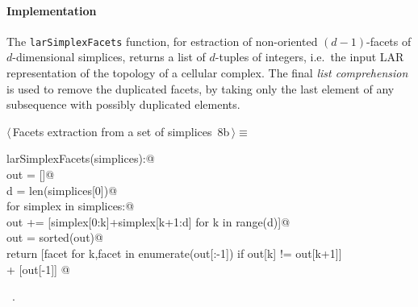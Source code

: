 \documentclass[11pt,oneside]{article}	%
\begin{document}
\paragraph{Implementation}

The \texttt{larSimplexFacets} function, for estraction of non-oriented $(d-1)$-facets of $d$-dimensional simplices, returns a list of $d$-tuples of integers, i.e.~the input LAR representation of the topology of a cellular complex. The final \emph{list comprehension} is used to remove the duplicated facets, by taking only the last element of any subsequence with possibly duplicated elements.
        
\begin{flushleft} \small
\begin{minipage}{\linewidth} \label{scrap8}
\protect{}$\langle\,$Facets extraction from a set of simplices\nobreak\ {\footnotesize 8b}$\,\rangle\equiv$
\vspace{-1ex}
\begin{list}{}{} \item
\mbox{}\verb@def larSimplexFacets(simplices):@\\
\mbox{}\verb@    out = []@\\
\mbox{}\verb@    d = len(simplices[0])@\\
\mbox{}\verb@    for simplex in simplices:@\\
\mbox{}\verb@        out += [simplex[0:k]+simplex[k+1:d] for k in range(d)]@\\
\mbox{}\verb@    out = sorted(out)@\\
\mbox{}\verb@    return [facet for k,facet in enumerate(out[:-1]) if out[k] != out[k+1]] \@\\
\mbox{}\verb@      + [out[-1]] @\\
\mbox{}\verb@@{\NWsep}
\end{list}
\vspace{-1ex}
\footnotesize\addtolength{\baselineskip}{-1ex}
\begin{list}{}{\setlength{\itemsep}{-\parsep}\setlength{\itemindent}{-\leftmargin}}
\item \NWtxtMacroRefIn\ .
\end{list}
\end{minipage}\\[4ex]
\end{flushleft}
\end{document}
